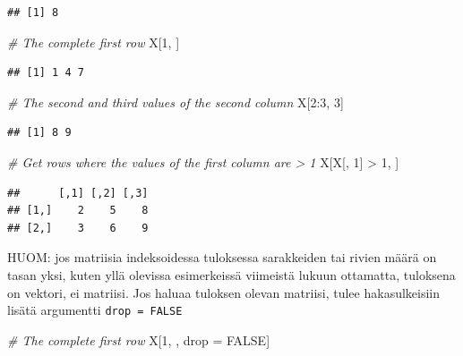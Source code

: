 \documentclass[
]{book}
\newenvironment{Shaded}{\begin{snugshade}}{\end{snugshade}}
\newcommand{\CommentTok}[1]{\textcolor[rgb]{0.56,0.35,0.01}{\textit{#1}}}
\newcommand{\ConstantTok}[1]{\textcolor[rgb]{0.00,0.00,0.00}{#1}}
\newcommand{\DecValTok}[1]{\textcolor[rgb]{0.00,0.00,0.81}{#1}}
\newcommand{\NormalTok}[1]{#1}
\newcommand{\OtherTok}[1]{\textcolor[rgb]{0.56,0.35,0.01}{#1}}
\newcommand{\SpecialCharTok}[1]{\textcolor[rgb]{0.00,0.00,0.00}{#1}}
\begin{document}
\begin{verbatim}
## [1] 8
\end{verbatim}

\begin{Shaded}
\begin{Highlighting}[]
\CommentTok{\# The complete first row}
\NormalTok{X[}\DecValTok{1}\NormalTok{, ]}
\end{Highlighting}
\end{Shaded}

\begin{verbatim}
## [1] 1 4 7
\end{verbatim}

\begin{Shaded}
\begin{Highlighting}[]
\CommentTok{\# The second and third values of the second column}
\NormalTok{X[}\DecValTok{2}\SpecialCharTok{:}\DecValTok{3}\NormalTok{, }\DecValTok{3}\NormalTok{]}
\end{Highlighting}
\end{Shaded}

\begin{verbatim}
## [1] 8 9
\end{verbatim}

\begin{Shaded}
\begin{Highlighting}[]
\CommentTok{\# Get rows where the values of the first column are \textgreater{} 1}
\NormalTok{X[X[, }\DecValTok{1}\NormalTok{] }\SpecialCharTok{\textgreater{}} \DecValTok{1}\NormalTok{, ]}
\end{Highlighting}
\end{Shaded}

\begin{verbatim}
##      [,1] [,2] [,3]
## [1,]    2    5    8
## [2,]    3    6    9
\end{verbatim}

HUOM: jos matriisia indeksoidessa tuloksessa sarakkeiden tai rivien määrä on tasan yksi, kuten yllä olevissa esimerkeissä viimeistä lukuun ottamatta, tuloksena on vektori, ei matriisi. Jos haluaa tuloksen olevan matriisi, tulee hakasulkeisiin lisätä argumentti \texttt{drop\ =\ FALSE}

\begin{Shaded}
\begin{Highlighting}[]
\CommentTok{\# The complete first row}
\NormalTok{X[}\DecValTok{1}\NormalTok{, , drop }\OtherTok{=} \ConstantTok{FALSE}\NormalTok{]}
\end{Highlighting}
\end{Shaded}
\end{document}
